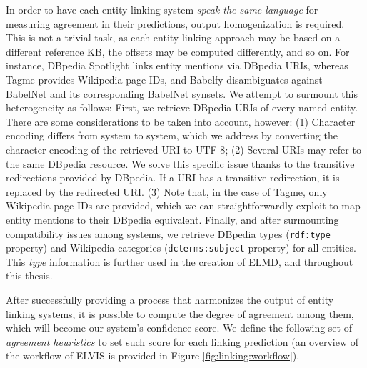 In order to have each entity linking system \textit{speak the same language} for measuring agreement in their predictions, output homogenization is required. This is not a trivial task, as each entity linking approach may be based on a different reference KB, the offsets may be computed differently, and so on. For instance, DBpedia Spotlight links entity mentions via DBpedia URIs, whereas Tagme provides Wikipedia page IDs, and Babelfy disambiguates against BabelNet \citep{NavigliPonzetto2012} and its corresponding BabelNet synsets. 
We attempt to surmount this heterogeneity as follows: First, we retrieve DBpedia URIs of every named entity. There are some considerations to be taken into account, however: (1) Character encoding differs from system to system, which we address by converting the character encoding of the retrieved URI to \textsc{UTF-8}; (2) Several URIs may refer to the same DBpedia resource. We solve this specific issue thanks to the transitive redirections provided by DBpedia. If a URI has a transitive redirection, it is replaced by the redirected URI. (3) Note that, in the case of Tagme, only Wikipedia page IDs are provided, which we can straightforwardly exploit to map entity mentions to their DBpedia equivalent. Finally, and after surmounting compatibility issues among systems, we retrieve DBpedia types (\texttt{rdf:type} property) and Wikipedia categories (\texttt{dcterms:subject} property) for all entities. This \textit{type} information is further used in the creation of \textsc{ELMD}, and throughout this thesis.



After successfully providing a process that harmonizes the output of entity linking systems, it is possible to compute the degree of agreement among them, which will become our system's confidence score. We define the following set of \textit{agreement heuristics} to set such score for each linking prediction (an overview of the workflow of \textsc{ELVIS} is provided in Figure \ref{fig:linking:workflow}).

